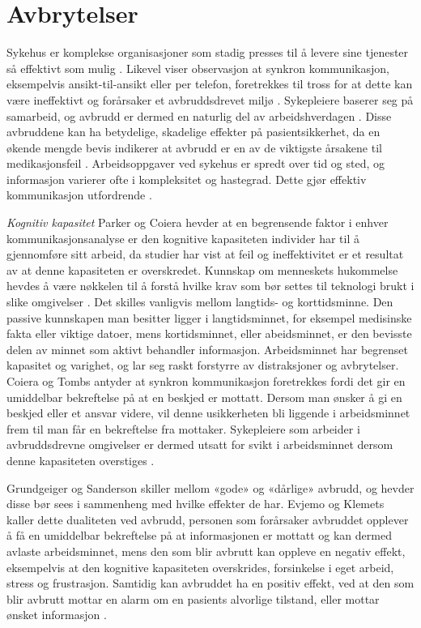 \section{Avbrytelser}
\label{chp:avbrytelser} 

Sykehus er komplekse organisasjoner som stadig presses til å levere sine tjenester så effektivt som mulig \cite{Scholl07}. Likevel viser observasjon at synkron kommunikasjon, eksempelvis ansikt-til-ansikt eller per telefon, foretrekkes til tross for at dette kan være ineffektivt og forårsaker et avbruddsdrevet miljø \cite{Scholl07, Parker00}. Sykepleiere baserer seg på samarbeid, og avbrudd er dermed en naturlig del av arbeidshverdagen \cite{Bardram04}. 
Disse avbruddene kan ha betydelige, skadelige effekter på pasientsikkerhet, da en økende mengde bevis indikerer at avbrudd er en av de viktigste årsakene til medikasjonsfeil \cite{Parker00, McGillis10}. Arbeidsoppgaver ved sykehus er spredt over tid og sted, og informasjon varierer ofte i kompleksitet og hastegrad. Dette gjør effektiv kommunikasjon utfordrende \cite{KlemetsRedundancy}. 

\noindent
\emph{Kognitiv kapasitet}
Parker og Coiera hevder at en begrensende faktor i enhver kommunikasjonsanalyse er den kognitive kapasiteten individer har til å gjennomføre sitt arbeid, da studier har vist at feil og ineffektivitet er et resultat av at denne kapasiteten er overskredet. Kunnskap om menneskets hukommelse hevdes å være nøkkelen til å forstå hvilke krav som bør settes til teknologi brukt i slike omgivelser \cite{Parker00}.
Det skilles vanligvis mellom langtids- og korttidsminne. Den passive kunnskapen man besitter ligger i langtidsminnet, for eksempel medisinske fakta eller viktige datoer, mens kortidsminnet, eller abeidsminnet, er den bevisste delen av minnet som aktivt behandler informasjon. Arbeidsminnet har begrenset kapasitet og varighet, og lar seg raskt forstyrre av distraksjoner og avbrytelser. Coiera og Tombs antyder at synkron kommunikasjon foretrekkes fordi det gir en umiddelbar bekreftelse på at en beskjed er mottatt. Dersom man ønsker å gi en beskjed eller et ansvar videre, vil denne usikkerheten bli liggende i arbeidsminnet frem til man får en bekreftelse fra mottaker. Sykepleiere som arbeider i avbruddsdrevne omgivelser er dermed utsatt for svikt i arbeidsminnet dersom denne kapasiteten overstiges \cite{Parker00}. 

\noindent
Grundgeiger og Sanderson skiller mellom «gode» og «dårlige» avbrudd, og hevder disse bør sees i sammenheng med hvilke effekter de har. Evjemo og Klemets kaller dette dualiteten ved avbrudd, personen som forårsaker avbruddet opplever å få en umiddelbar bekreftelse på at informasjonen er mottatt og kan dermed avlaste arbeidsminnet, mens den som blir avbrutt kan oppleve en negativ effekt, eksempelvis at den kognitive kapasiteten overskrides, forsinkelse i eget arbeid, stress og frustrasjon. Samtidig kan avbruddet ha en positiv effekt, ved at den som blir avbrutt mottar en alarm om en pasients alvorlige tilstand, eller mottar ønsket informasjon \cite{Evjemo, Grundgeiger09}. 
